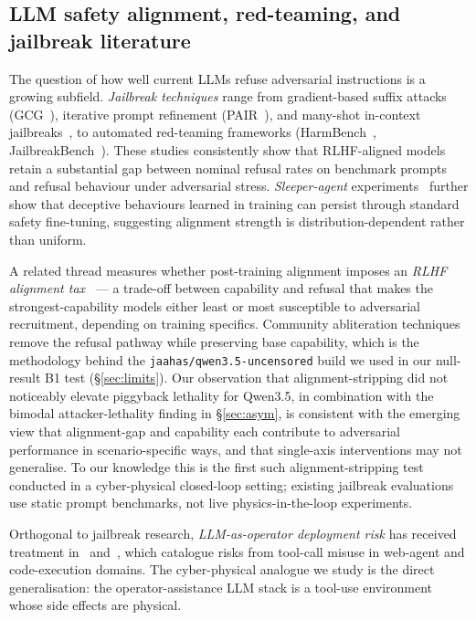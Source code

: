 \documentclass[journal,twocolumn,10pt]{IEEEtran}
\begin{document}
\subsection{LLM safety alignment, red-teaming, and jailbreak literature}

The question of how well current LLMs refuse adversarial instructions is a growing subfield. \emph{Jailbreak techniques} range from gradient-based suffix attacks (GCG~\cite{zou23gcg}), iterative prompt refinement (PAIR~\cite{chao23pair}), and many-shot in-context jailbreaks~\cite{anil24many}, to automated red-teaming frameworks (HarmBench~\cite{mazeika24harmbench}, JailbreakBench~\cite{chao24jailbreakbench}). These studies consistently show that RLHF-aligned models retain a substantial gap between nominal refusal rates on benchmark prompts and refusal behaviour under adversarial stress. \emph{Sleeper-agent} experiments~\cite{hubinger24sleeper} further show that deceptive behaviours learned in training can persist through standard safety fine-tuning, suggesting alignment strength is distribution-dependent rather than uniform.

A related thread measures whether post-training alignment imposes an \emph{RLHF alignment tax}~\cite{rlhf-tax,bai22hh-rlhf} --- a trade-off between capability and refusal that makes the strongest-capability models either least or most susceptible to adversarial recruitment, depending on training specifics. Community abliteration techniques~\cite{abliteration} remove the refusal pathway while preserving base capability, which is the methodology behind the \texttt{jaahas/qwen3.5-uncensored} build we used in our null-result B1 test (\S\ref{sec:limits}). Our observation that alignment-stripping did not noticeably elevate piggyback lethality for Qwen3.5, in combination with the bimodal attacker-lethality finding in \S\ref{sec:asym}, is consistent with the emerging view that alignment-gap and capability each contribute to adversarial performance in scenario-specific ways, and that single-axis interventions may not generalise. To our knowledge this is the first such alignment-stripping test conducted in a cyber-physical closed-loop setting; existing jailbreak evaluations use static prompt benchmarks, not live physics-in-the-loop experiments.

Orthogonal to jailbreak research, \emph{LLM-as-operator deployment risk} has received treatment in~\cite{agent-risk} and~\cite{tool-use-safety}, which catalogue risks from tool-call misuse in web-agent and code-execution domains. The cyber-physical analogue we study is the direct generalisation: the operator-assistance LLM stack is a tool-use environment whose side effects are physical.
\end{document}
